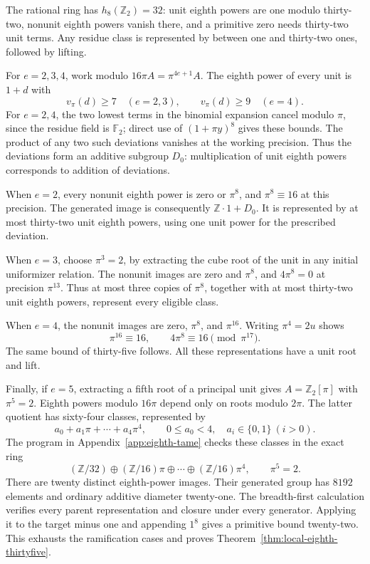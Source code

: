 \documentclass[11pt]{amsart}
\theoremstyle{definition}
\numberwithin{equation}{section}
\begin{document}
The rational ring has $h_8(\mathbb Z_2)=32$: unit eighth powers are
one modulo thirty-two, nonunit eighth powers vanish there, and a
primitive zero needs thirty-two unit terms. Any residue class is
represented by between one and thirty-two ones, followed by lifting.

For $e=2,3,4$, work modulo $16\pi A=\pi^{4e+1}A$.
The eighth power of every unit is $1+d$ with
\[
 v_\pi(d)\ge7\quad(e=2,3),\qquad
 v_\pi(d)\ge9\quad(e=4).
\]
For $e=2,4$, the two lowest terms in the binomial expansion cancel
modulo $\pi$, since the residue field is $\mathbb F_2$; direct use
of $(1+\pi y)^8$ gives these bounds. The product of any two such
deviations vanishes at the working precision. Thus the deviations
form an additive subgroup $D_0$: multiplication of unit eighth powers
corresponds to addition of deviations.

When $e=2$, every nonunit eighth power is zero or $\pi^8$, and
$\pi^8\equiv16$ at this precision. The generated image is consequently
$\mathbb Z\cdot1+D_0$. It is represented by at most thirty-two unit
eighth powers, using one unit power for the prescribed deviation.

When $e=3$, choose $\pi^3=2$, by extracting the cube root of the
unit in any initial uniformizer relation. The nonunit images are
zero and $\pi^8$, and $4\pi^8=0$ at precision $\pi^{13}$.
Thus at most three copies of $\pi^8$, together with at most
thirty-two unit eighth powers, represent every eligible class.

When $e=4$, the nonunit images are zero, $\pi^8$, and $\pi^{16}$.
Writing $\pi^4=2u$ shows
\[
 \pi^{16}\equiv16,\qquad4\pi^8\equiv16\pmod{\pi^{17}}.
\]
The same bound of thirty-five follows. All these representations
have a unit root and lift.

Finally, if $e=5$, extracting a fifth root of a principal unit gives
$A=\mathbb Z_2[\pi]$ with $\pi^5=2$. Eighth powers modulo $16\pi$
depend only on roots modulo $2\pi$. The latter quotient has sixty-four
classes, represented by
\[
 a_0+a_1\pi+\cdots+a_4\pi^4,
 \qquad0\le a_0<4,\quad a_i\in\{0,1\}\ (i>0).
\]
The program in Appendix~\ref{app:eighth-tame} checks these classes in the exact ring
\[
 (\mathbb Z/32)\oplus
 (\mathbb Z/16)\pi\oplus\cdots\oplus(\mathbb Z/16)\pi^4,
 \qquad\pi^5=2.
\]
There are twenty distinct eighth-power images. Their generated group
has $8192$ elements and ordinary additive diameter twenty-one.
The breadth-first calculation verifies every parent representation
and closure under every generator. Applying it to the target minus
one and appending $1^8$ gives a primitive bound twenty-two.
This exhausts the ramification cases and proves
Theorem~\ref{thm:local-eighth-thirtyfive}.
\end{document}
